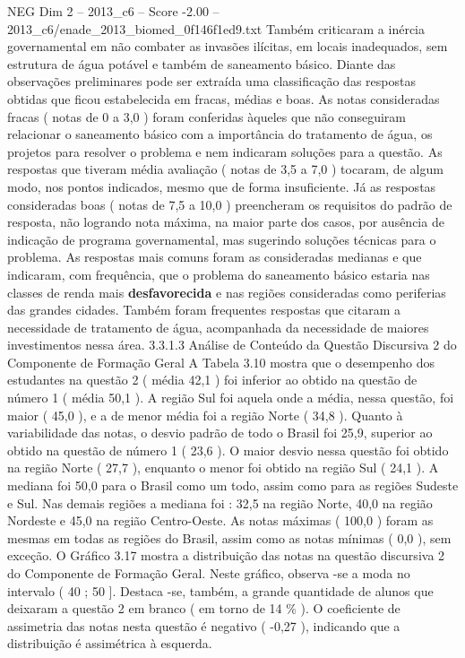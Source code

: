 \begin{textsample}{NEG Dim 2 – 2013\_c6 – Score -2.00 – 2013\_c6/enade\_2013\_biomed\_0f146f1ed9.txt}
Também criticaram a inércia governamental em não combater as invasões ilícitas, em locais inadequados, sem estrutura de água potável e também de saneamento básico.
Diante das observações preliminares pode ser extraída uma classificação das respostas obtidas que ficou estabelecida em fracas, médias e boas.
As notas consideradas fracas ( notas de 0 a 3,0 ) foram conferidas àqueles que não conseguiram relacionar o saneamento básico com a importância do tratamento de água, os projetos para resolver o problema e nem indicaram soluções para a questão.
As respostas que tiveram média avaliação ( notas de 3,5 a 7,0 ) tocaram, de algum modo, nos pontos indicados, mesmo que de forma insuficiente.
Já as respostas consideradas boas ( notas de 7,5 a 10,0 ) preencheram os requisitos do padrão de resposta, não logrando nota máxima, na maior parte dos casos, por ausência de indicação de programa governamental, mas sugerindo soluções técnicas para o problema.
As respostas mais comuns foram as consideradas medianas e que indicaram, com frequência, que o problema do saneamento básico estaria nas classes de renda mais \textbf{desfavorecida} e nas regiões consideradas como periferias das grandes cidades.
Também foram frequentes respostas que citaram a necessidade de tratamento de água, acompanhada da necessidade de maiores investimentos nessa área. 3.3.1.3 Análise de Conteúdo da Questão Discursiva 2 do Componente de Formação Geral A Tabela 3.10 mostra que o desempenho dos estudantes na questão 2 ( média 42,1 ) foi inferior ao obtido na questão de número 1 ( média 50,1 ).
A região Sul foi aquela onde a média, nessa questão, foi maior ( 45,0 ), e a de menor média foi a região Norte ( 34,8 ).
Quanto à variabilidade das notas, o desvio padrão de todo o Brasil foi 25,9, superior ao obtido na questão de número 1 ( 23,6 ).
O maior desvio nessa questão foi obtido na região Norte ( 27,7 ), enquanto o menor foi obtido na região Sul ( 24,1 ).
A mediana foi 50,0 para o Brasil como um todo, assim como para as regiões Sudeste e Sul.
Nas demais regiões a mediana foi : 32,5 na região Norte, 40,0 na região Nordeste e 45,0 na região Centro-Oeste.
As notas máximas ( 100,0 ) foram as mesmas em todas as regiões do Brasil, assim como as notas mínimas ( 0,0 ), sem exceção.
O Gráfico 3.17 mostra a distribuição das notas na questão discursiva 2 do Componente de Formação Geral.
Neste gráfico, observa -se a moda no intervalo ( 40 ; 50 ].
Destaca -se, também, a grande quantidade de alunos que deixaram a questão 2 em branco ( em torno de 14 \% ).
O coeficiente de assimetria das notas nesta questão é negativo ( -0,27 ), indicando que a distribuição é assimétrica à esquerda.

\end{textsample}

